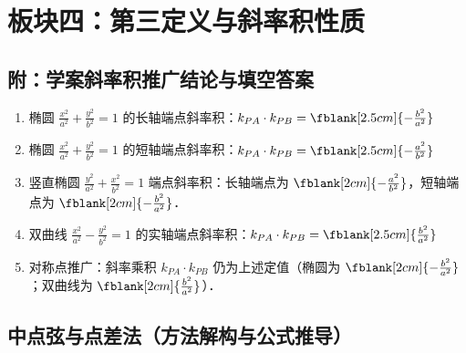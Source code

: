\documentclass[11pt,a4paper]{ctexart}
\begin{document}
\newpage

\section{板块四：第三定义与斜率积性质}

\subsection*{附：学案斜率积推广结论与填空答案}
\begin{enumerate}[label=\arabic*.]
  \item 椭圆 $\frac{x^2}{a^2} + \frac{y^2}{b^2} = 1$ 的长轴端点斜率积：$k_{PA} \cdot k_{PB} = \fblank[2.5cm]{-\frac{b^2}{a^2}}$ 
  \item 椭圆 $\frac{x^2}{a^2} + \frac{y^2}{b^2} = 1$ 的短轴端点斜率积：$k_{PA} \cdot k_{PB} = \fblank[2.5cm]{-\frac{a^2}{b^2}}$ 
  \item 竖直椭圆 $\frac{y^2}{a^2} + \frac{x^2}{b^2} = 1$ 端点斜率积：长轴端点为 $\fblank[2cm]{-\frac{a^2}{b^2}}$，短轴端点为 $\fblank[2cm]{-\frac{b^2}{a^2}}$．
  \item 双曲线 $\frac{x^2}{a^2} - \frac{y^2}{b^2} = 1$ 的实轴端点斜率积：$k_{PA} \cdot k_{PB} = \fblank[2.5cm]{\frac{b^2}{a^2}}$ 
  \item 对称点推广：斜率乘积 $k_{PA} \cdot k_{PB}$ 仍为上述定值（椭圆为 $\fblank[2cm]{-\frac{b^2}{a^2}}$；双曲线为 $\fblank[2cm]{\frac{b^2}{a^2}}$）．
\end{enumerate}

\subsection*{中点弦与点差法（方法解构与公式推导）}
\end{document}
